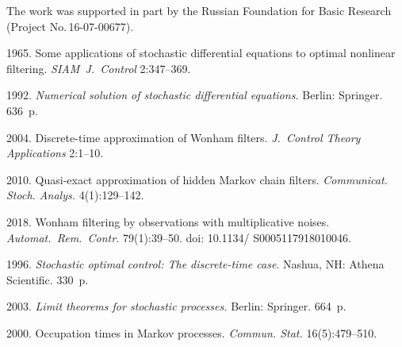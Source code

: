 





\Ack
\noindent
The work was supported in part by the Russian Foundation
for Basic Research (Project No.\,16-07-00677).




  \begin{multicols}{2}

\renewcommand{\bibname}{\protect\rmfamily References}

{\small\frenchspacing
 {%
 \begin{thebibliography}{99}
 1965.
Some applications of stochastic differential equations to optimal
  nonlinear filtering.
\textit{SIAM~J.~Control} 2:347--369. 

 1992. \textit{Numerical solution of stochastic
differential equations.} Berlin: Springer. 636~p.

 2004.
Discrete-time approximation of Wonham filters.
\textit{J.~Control Theory Applications} 2:1--10.

 2010.
Quasi-exact approximation of hidden Markov chain filters.
\textit{Communicat. Stoch. Analys.} 4(1):129--142.

 2018. Wonham filtering by observations
with multiplicative noises. \textit{Automat.~Rem.~Contr.} 79(1):39--50.  
doi: 10.1134/ S0005117918010046.
 
 1996.
\textit{Stochastic optimal control: The discrete-time case}.
Nashua, NH: Athena Scientific. 330~p.
  
   2003.
\textit{Limit theorems for stochastic processes.}
Berlin: Springer. 664~p.

2000. Occupation times in Markov processes.
\textit{Commun. Stat.} 16(5):479--510. 


\end{thebibliography}}}
\end{multicols}
